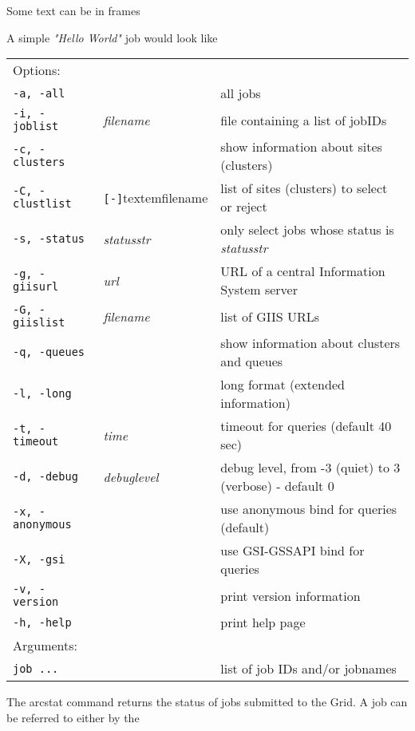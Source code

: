 \begin{framed}
Some text can be in frames
\end{framed}

A simple \textit{"Hello World"} job would look like

\begin{shaded}
\end{shaded}
\begin{longtable}{llp{8cm}}
   Options:&&\\
   \texttt{-a, -all}& & all jobs\\
   \texttt{-i, -joblist}& \textit{filename}& file containing a list of jobIDs\\
   \texttt{-c, -clusters}& & show information about sites (clusters)\\
   \texttt{-C, -clustlist}&\verb#[-]#textem{filename}&list of sites (clusters) to select or reject\\
   \texttt{-s, -status}& \textit{statusstr} &only select jobs whose status is \textit{statusstr}\\
   \texttt{-g, -giisurl}& \textit{url} &URL of a central Information System server\\
   \texttt{-G, -giislist}&\textit{filename}&list of GIIS URLs\\
   \texttt{-q, -queues}&&show information about clusters and queues\\
   \texttt{-l, -long}& & long format (extended information)\\
   \texttt{-t, -timeout}& \textit{time}& timeout for queries (default 40 sec)\\
   \texttt{-d, -debug}& \textit{debuglevel}&debug level, from -3 (quiet) to 3 (verbose) - default 0\\
   \texttt{-x, -anonymous}& &use anonymous bind for queries (default)\\
   \texttt{-X, -gsi}& & use GSI-GSSAPI bind for queries\\
   \texttt{-v, -version}& & print version information\\
   \texttt{-h, -help}& & print help page\\
   Arguments:&&\\
   \texttt{job ...} && list of job IDs and/or jobnames\\
\end{longtable}

The arcstat command returns the status of jobs submitted to the Grid.
A job can be referred to either by the

